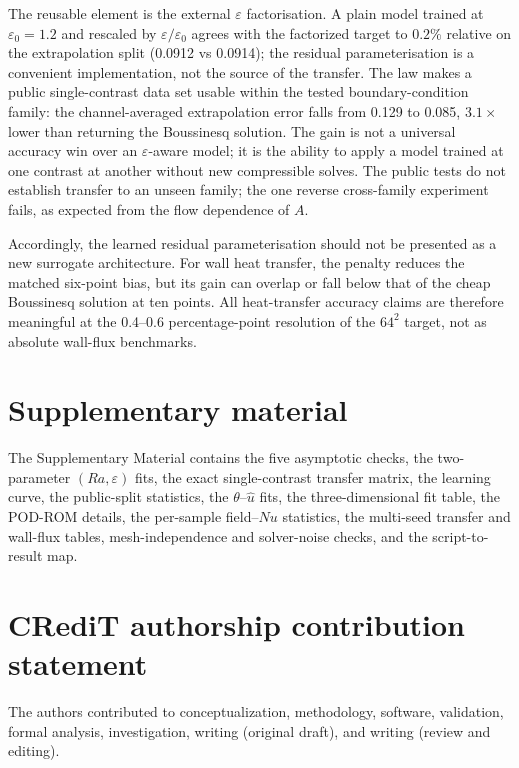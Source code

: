 \documentclass[preprint,11pt,a4paper,times]{elsarticle}
\begin{document}
The reusable element is the external $\varepsilon$ factorisation. A plain model trained at
$\varepsilon_0=1.2$ and rescaled by $\varepsilon/\varepsilon_0$ agrees with the factorized
target to $0.2\%$ relative on the extrapolation split (0.0912 vs 0.0914); the residual parameterisation is a convenient
implementation, not the source of the transfer. The law makes a public single-contrast
data set usable within the tested boundary-condition family: the channel-averaged extrapolation error
falls from 0.129 to 0.085, $3.1\times$ lower than returning the Boussinesq solution. The gain
is not a universal accuracy win over an $\varepsilon$-aware model; it is the ability to apply a
model trained at one contrast at another without new compressible solves. The public tests do
not establish transfer to an unseen family; the one reverse cross-family experiment fails, as
expected from the flow dependence of $A$.

Accordingly, the learned residual parameterisation should not be presented as a new surrogate
architecture. For wall heat transfer, the penalty reduces the matched six-point bias, but its
gain can overlap or fall below that of the cheap Boussinesq solution at ten points. All
heat-transfer accuracy claims are therefore meaningful at the 0.4--0.6 percentage-point
resolution of the $64^2$ target, not as absolute wall-flux benchmarks.

\section*{Supplementary material}

The Supplementary Material contains the five asymptotic checks, the two-parameter
$(Ra,\varepsilon)$ fits, the exact single-contrast transfer matrix, the learning curve, the
public-split statistics, the $\theta$--$\hat u$ fits, the three-dimensional fit table, the
POD-ROM details, the per-sample field--$Nu$ statistics, the multi-seed transfer and wall-flux
tables, mesh-independence and solver-noise checks, and the script-to-result map.

\section*{CRediT authorship contribution statement}

The authors contributed to conceptualization, methodology, software, validation, formal
analysis, investigation, writing (original draft), and writing (review and editing).
\end{document}
